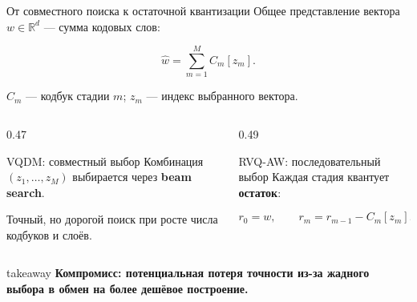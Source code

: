 \documentclass[aspectratio=169,10pt]{beamer}
\newcommand{\keypoint}[1]{%
  \begin{beamercolorbox}[
    sep=1.8mm,
    wd=\linewidth
  ]{takeaway}
    \small\bfseries #1
  \end{beamercolorbox}%
}
\begin{document}
\begin{frame}[t]{От совместного поиска к остаточной квантизации}
  Общее представление вектора
  $w\in\mathbb{R}^{d}$ --- сумма кодовых слов:

  \[
    \widehat w = \sum_{m=1}^{M} C_m[z_m].
  \]

  \small
  $C_m$ --- кодбук стадии $m$;
  $z_m$ --- индекс выбранного вектора.
  \normalsize

  \begin{columns}[T,onlytextwidth]

    \begin{column}{0.47\textwidth}
      \begin{block}{VQDM: совместный выбор}
        Комбинация $(z_1,\ldots,z_M)$ выбирается
        через \textbf{beam search}.
        \par\smallskip

        Точный, но дорогой поиск при росте
        числа кодбуков и слоёв.
      \end{block}
    \end{column}

    \begin{column}{0.49\textwidth}
      \begin{block}{RVQ-AW: последовательный выбор}
        Каждая стадия квантует \textbf{остаток}:

        \[
          r_0=w,
          \qquad
          r_m=r_{m-1}-C_m[z_m].
        \]
      \end{block}
    \end{column}

  \end{columns}

  \vfill

  \keypoint{
    Компромисс: потенциальная потеря точности
    из-за жадного выбора в обмен на более дешёвое построение.
  }
\end{frame}

\end{document}
